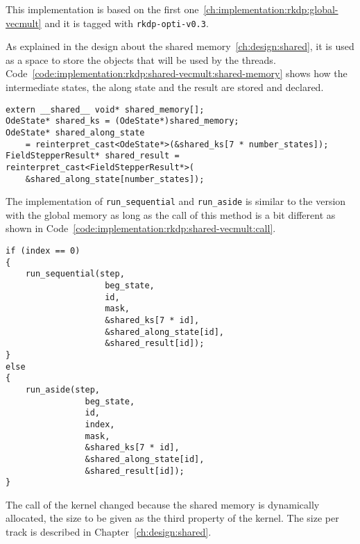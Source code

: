 This implementation is based on the first one~\ref{ch:implementation:rkdp:global-vecmult}
and it is tagged with \texttt{rkdp-opti-v0.3}.

As explained in the design about the shared memory~\ref{ch:design:shared},
it is used as a space to store the objects that will be used by the threads.
Code~\ref{code:implementation:rkdp:shared-vecmult:shared-memory} shows how the
intermediate states, the along state and the result are stored and declared.

\begin{code}
    \label{code:implementation:rkdp:shared-vecmult:shared-memory}
    \begin{verbatim}
extern __shared__ void* shared_memory[];
OdeState* shared_ks = (OdeState*)shared_memory;
OdeState* shared_along_state
    = reinterpret_cast<OdeState*>(&shared_ks[7 * number_states]);
FieldStepperResult* shared_result = reinterpret_cast<FieldStepperResult*>(
    &shared_along_state[number_states]);
    \end{verbatim}
\end{code}

The implementation of \texttt{run\_sequential} and \texttt{run\_aside} is
similar to the version with the global memory as long as the call of
this method is a bit different as shown in
Code~\ref{code:implementation:rkdp:shared-vecmult:call}.

\begin{code}
    \label{code:implementation:rkdp:shared-vecmult:call}
    \begin{verbatim}
if (index == 0)
{
    run_sequential(step,
                    beg_state,
                    id,
                    mask,
                    &shared_ks[7 * id],
                    &shared_along_state[id],
                    &shared_result[id]);
}
else
{
    run_aside(step,
                beg_state,
                id,
                index,
                mask,
                &shared_ks[7 * id],
                &shared_along_state[id],
                &shared_result[id]);
}
    \end{verbatim}
\end{code}

The call of the kernel changed because the shared memory is
dynamically allocated, the size to be given as the third property of the
kernel.
The size per track is described in Chapter~\ref{ch:design:shared}.

